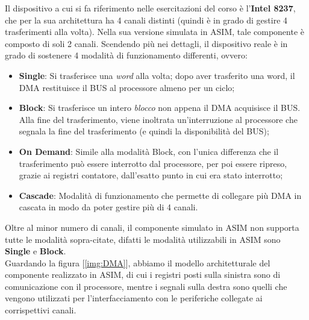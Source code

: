 Il dispositivo a cui si fa riferimento nelle esercitazioni del corso è l'\textbf{Intel 8237}, che per la sua architettura ha 4 canali distinti (quindi è in grado di gestire 4 trasferimenti alla volta). Nella sua versione simulata in ASIM, tale componente è composto di soli 2 canali.
Scendendo più nei dettagli, il dispositivo reale è in grado di sostenere 4 modalità di funzionamento differenti, ovvero:
\begin{itemize}
    \item \textbf{Single}: Si trasferisce una \textit{word} alla volta; dopo aver trasferito una word, il DMA restituisce il BUS al processore almeno per un ciclo;
    \item \textbf{Block}: Si trasferisce un intero \textit{blocco} non appena il DMA acquisisce il BUS. Alla fine del trasferimento, viene inoltrata un'interruzione al processore che segnala la fine del trasferimento (e quindi la disponibilità del BUS);
    \item \textbf{On Demand}: Simile alla modalità Block, con l'unica differenza che il trasferimento può essere interrotto dal processore, per poi essere ripreso, grazie ai registri contatore, dall'esatto punto in cui era stato interrotto;
    \item \textbf{Cascade}: Modalità di funzionamento che permette di collegare più DMA in cascata in modo da poter gestire più di 4 canali.
\end{itemize}

Oltre al minor numero di canali, il componente simulato in ASIM non supporta tutte le modalità sopra-citate, difatti le modalità utilizzabili in ASIM sono \textbf{Single} e \textbf{Block}.\\
Guardando la figura [\ref{img:DMA}], abbiamo il modello architetturale del componente realizzato in ASIM, di cui i registri posti sulla sinistra sono di comunicazione con il processore, mentre i segnali sulla destra sono quelli che vengono utilizzati per l'interfacciamento con le periferiche collegate ai corrispettivi canali.

